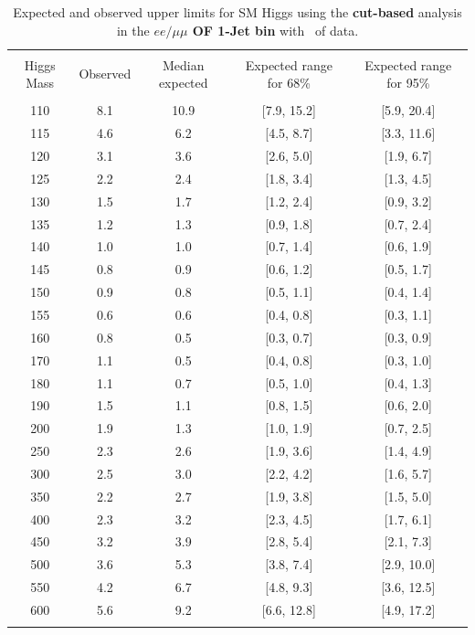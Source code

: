 \begin{table}[hbp!]
\begin{center}
\begin{tabular}{c c c c c}
\hline
\vspace{-3mm} && \\
 Higgs Mass & Observed  & Median expected & Expected range for 68\% & Expected range for 95\%   \\
\vspace{-3mm} && \\
\hline
110 & 8.1 & 10.9 & [7.9, 15.2] & [5.9, 20.4] \\
115 & 4.6 & 6.2 & [4.5, 8.7] & [3.3, 11.6] \\
120 & 3.1 & 3.6 & [2.6, 5.0] & [1.9, 6.7] \\
125 & 2.2 & 2.4 & [1.8, 3.4] & [1.3, 4.5] \\
130 & 1.5 & 1.7 & [1.2, 2.4] & [0.9, 3.2] \\
135 & 1.2 & 1.3 & [0.9, 1.8] & [0.7, 2.4] \\
140 & 1.0 & 1.0 & [0.7, 1.4] & [0.6, 1.9] \\
145 & 0.8 & 0.9 & [0.6, 1.2] & [0.5, 1.7] \\
150 & 0.9 & 0.8 & [0.5, 1.1] & [0.4, 1.4] \\
155 & 0.6 & 0.6 & [0.4, 0.8] & [0.3, 1.1] \\
160 & 0.8 & 0.5 & [0.3, 0.7] & [0.3, 0.9] \\
170 & 1.1 & 0.5 & [0.4, 0.8] & [0.3, 1.0] \\
180 & 1.1 & 0.7 & [0.5, 1.0] & [0.4, 1.3] \\
190 & 1.5 & 1.1 & [0.8, 1.5] & [0.6, 2.0] \\
200 & 1.9 & 1.3 & [1.0, 1.9] & [0.7, 2.5] \\
250 & 2.3 & 2.6 & [1.9, 3.6] & [1.4, 4.9] \\
300 & 2.5 & 3.0 & [2.2, 4.2] & [1.6, 5.7] \\
350 & 2.2 & 2.7 & [1.9, 3.8] & [1.5, 5.0] \\
400 & 2.3 & 3.2 & [2.3, 4.5] & [1.7, 6.1] \\
450 & 3.2 & 3.9 & [2.8, 5.4] & [2.1, 7.3] \\
500 & 3.6 & 5.3 & [3.8, 7.4] & [2.9, 10.0] \\
550 & 4.2 & 6.7 & [4.8, 9.3] & [3.6, 12.5] \\
600 & 5.6 & 9.2 & [6.6, 12.8] & [4.9, 17.2] \\

\vspace{-3mm} && \\
\hline
\hline
\end{tabular}
\caption{Expected and observed upper limits for SM Higgs using the
  {\bf cut-based} analysis in the {\bf $ee/\mu\mu$ OF 1-Jet bin} with \intlumiEightTeV\ of data.}
\label{tab:cutbase_uls_1jof}
\end{center}
\end{table}


